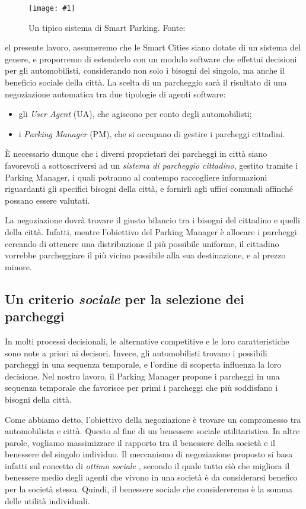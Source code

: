 \documentclass[11pt,a4paper,twoside]{article}
\numberwithin{figure}{section}
\numberwithin{equation}{section}
\newcommand{\img}[6]{
    \begin{figure}[#5]
        \centerline{\texttt{[image: \#1]}}
        \caption{#2}
        \label{#3}
    \end{figure}
}
\begin{document}
\img{arch}{Un tipico sistema di Smart Parking. Fonte: \cite{2}}{fig:1}{.7}{hb}

Nel presente lavoro, assumeremo che le Smart Cities siano dotate di un sistema del genere, e proporremo di estenderlo con un modulo software che effettui decisioni per gli automobilisti, considerando non solo i bisogni del singolo, ma anche il beneficio sociale della città. La scelta di un parcheggio sarà il risultato di una negoziazione automatica tra due tipologie di agenti software:
\begin{itemize}
    \item gli \emph{User Agent} (UA), che agiscono per conto degli automobilisti;
    \item i \emph{Parking Manager} (PM), che si occupano di gestire i parcheggi cittadini.
\end{itemize}
È necessario dunque che i diversi proprietari dei parcheggi in città siano favorevoli a sottoscriversi ad un \emph{sistema di parcheggio cittadino}, gestito tramite i Parking Manager, i quali potranno al contempo raccogliere informazioni riguardanti gli specifici bisogni della città, e fornirli agli uffici comunali affinché possano essere valutati.

La negoziazione dovrà trovare il giusto bilancio tra i bisogni del cittadino e quelli della città. Infatti, mentre l'obiettivo del Parking Manager è allocare i parcheggi cercando di ottenere una distribuzione il più possibile uniforme, il cittadino vorrebbe parcheggiare il più vicino possibile alla sua destinazione, e al prezzo minore.

\subsection{Un criterio \emph{sociale} per la selezione dei parcheggi}

In molti processi decisionali, le alternative competitive e le loro caratteristiche sono note a priori ai decisori. Invece, gli automobilisti trovano i possibili parcheggi in una sequenza temporale, e l'ordine di scoperta influenza la loro decisione.
Nel nostro lavoro, il Parking Manager propone i parcheggi in una sequenza temporale che favorisce per primi i parcheggi che più soddisfano i bisogni della città.

Come abbiamo detto, l'obiettivo della negoziazione è trovare un compromesso tra automobilista e città. Questo al fine di un benessere sociale utilitaristico. In altre parole, vogliamo massimizzare il rapporto tra il benessere della società e il benessere del singolo individuo.
Il meccanismo di negoziazione proposto si basa infatti sul concetto di \emph{ottimo sociale} \cite{4}, secondo il quale tutto ciò che migliora il benessere medio degli agenti che vivono in una società è da considerarsi benefico per la società stessa. Quindi, il benessere sociale che considereremo è la somma delle utilità individuali.
\end{document}
